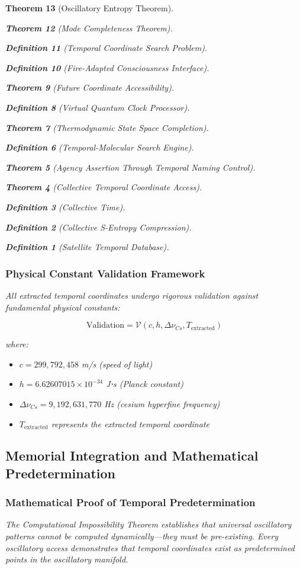 \documentclass[12pt,a4paper]{article}
\newtheorem{theorem}{Theorem}[section]
\newtheorem{definition}[theorem]{Definition}
\begin{document}
\begin{theorem}[Oscillatory Entropy Theorem]
\begin{theorem}[Mode Completeness Theorem]
\begin{enumerate}
\begin{definition}[Temporal Coordinate Search Problem]
\begin{algorithm}
\begin{definition}[Fire-Adapted Consciousness Interface]
\begin{theorem}[Future Coordinate Accessibility]
\begin{definition}[Virtual Quantum Clock Processor]
\begin{itemize}
\begin{itemize}
\begin{theorem}[Thermodynamic State Space Completion]
\begin{definition}[Temporal-Molecular Search Engine]
\begin{theorem}[Agency Assertion Through Temporal Naming Control]
\begin{remark}
\begin{theorem}[Collective Temporal Coordinate Access]
\begin{definition}[Collective Time]
\begin{definition}[Collective S-Entropy Compression]
\begin{definition}[Satellite Temporal Database]
\begin{algorithm}
\begin{table}[h]
{{\subsubsection{Physical Constant Validation Framework}

All extracted temporal coordinates undergo rigorous validation against fundamental physical constants:

\begin{equation}
\text{Validation} = \mathcal{V}(c, h, \Delta \nu_{Cs}, T_{\text{extracted}})
\end{equation}

where:
\begin{itemize}
\item $c = 299,792,458$ m/s (speed of light)
\item $h = 6.62607015 \times 10^{-34}$ J⋅s (Planck constant)
\item $\Delta \nu_{Cs} = 9,192,631,770$ Hz (cesium hyperfine frequency)
\item $T_{\text{extracted}}$ represents the extracted temporal coordinate
\end{itemize}

\subsection{Memorial Integration and Mathematical Predetermination}

\subsubsection{Mathematical Proof of Temporal Predetermination}

The Computational Impossibility Theorem establishes that universal oscillatory patterns cannot be computed dynamically—they must be pre-existing. Every oscillatory access demonstrates that temporal coordinates exist as predetermined points in the oscillatory manifold.

}}
\end{table}
\end{algorithm}
\end{definition}
\end{definition}
\end{definition}
\end{theorem}
\end{remark}
\end{theorem}
\end{definition}
\end{theorem}
\end{itemize}
\end{itemize}
\end{definition}
\end{theorem}
\end{definition}
\end{algorithm}
\end{definition}
\end{enumerate}
\end{theorem}
\end{theorem}
\end{document}
